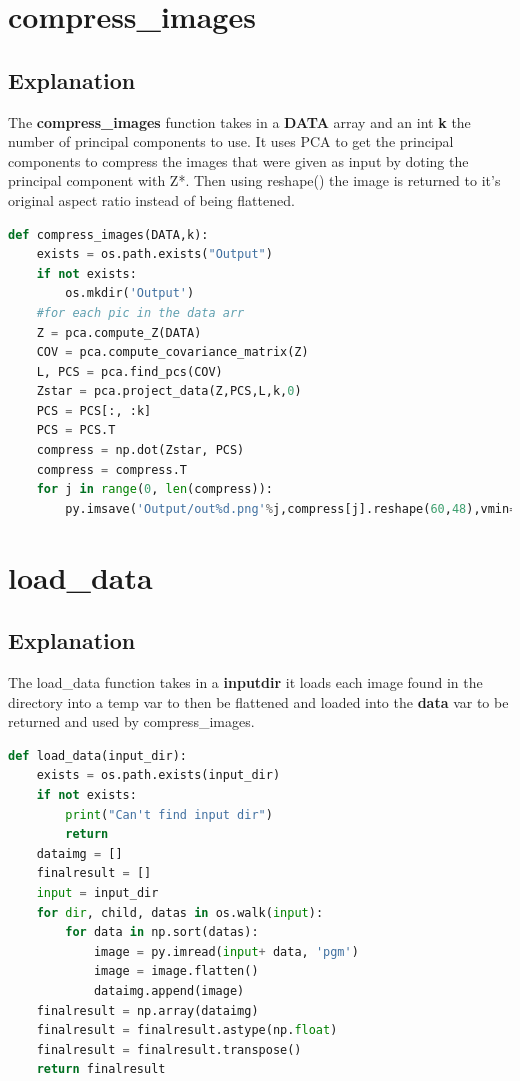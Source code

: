 \documentclass{article}
\begin{document}
\section{compress\_images}
\subsection{Explanation}
The \textbf{compress\_images} function takes in a \textbf{DATA} array and an int \textbf{k} the number of principal components to use. It uses PCA to get the principal components to compress the images that were given as input by doting the principal component with Z*. Then using reshape() the image is returned to it's original aspect ratio instead of being flattened.
\begin{lstlisting}[language=Python]
def compress_images(DATA,k):
    exists = os.path.exists("Output")
    if not exists:
        os.mkdir('Output')
    #for each pic in the data arr
    Z = pca.compute_Z(DATA)
    COV = pca.compute_covariance_matrix(Z)
    L, PCS = pca.find_pcs(COV)
    Zstar = pca.project_data(Z,PCS,L,k,0)
    PCS = PCS[:, :k]
    PCS = PCS.T
    compress = np.dot(Zstar, PCS)
    compress = compress.T
    for j in range(0, len(compress)):
        py.imsave('Output/out%d.png'%j,compress[j].reshape(60,48),vmin=0,vmax=255,cmap='gray',format='png')
\end{lstlisting}

\section{load\_data}
\subsection{Explanation}
The load\_data function takes in a \textbf{inputdir} it loads each image found in the directory into a temp var to then be flattened and loaded into the \textbf{data} var to be returned and used by compress\_images.

\begin{lstlisting}[language=Python]
def load_data(input_dir):
    exists = os.path.exists(input_dir)
    if not exists:
        print("Can't find input dir")
        return
    dataimg = []
    finalresult = []
    input = input_dir
    for dir, child, datas in os.walk(input):
        for data in np.sort(datas):
            image = py.imread(input+ data, 'pgm')
            image = image.flatten()
            dataimg.append(image)
    finalresult = np.array(dataimg)
    finalresult = finalresult.astype(np.float)
    finalresult = finalresult.transpose()
    return finalresult
\end{lstlisting}
\end{document}
